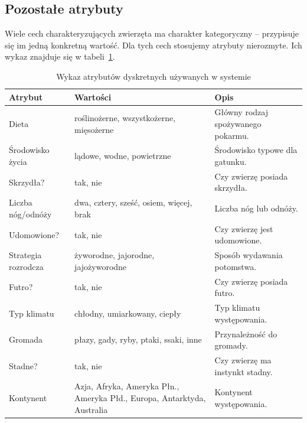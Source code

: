 \documentclass[11pt,a4paper]{article}
\begin{document}
\subsection{Pozostałe atrybuty}
Wiele cech charakteryzujących zwierzęta ma charakter kategoryczny -- przypisuje
się im jedną konkretną wartość. Dla tych cech stosujemy atrybuty nierozmyte.
Ich wykaz znajduje się w tabeli~\ref{tab:discrete}.

\begin{table}[h]
\centering
\caption{Wykaz atrybutów dyskretnych używanych w systemie}
\label{tab:discrete}
\small
\setlength{\tabcolsep}{5pt}
\renewcommand{\arraystretch}{1.2}
\begin{tabularx}{\linewidth}{%
    >{\raggedright\arraybackslash}p{2.9cm}%
    >{\raggedright\arraybackslash\hsize=1.25\hsize}X%
    >{\raggedright\arraybackslash\hsize=0.75\hsize}X}
\toprule
\textbf{Atrybut} & \textbf{Wartości} & \textbf{Opis} \\
\midrule
Dieta               & roślinożerne, wszystkożerne, mięsożerne  & Główny rodzaj spożywanego pokarmu. \\
Środowisko życia    & lądowe, wodne, powietrzne                & Środowisko typowe dla gatunku. \\
Skrzydła?           & tak, nie                                 & Czy zwierzę posiada skrzydła. \\
Liczba nóg/odnóży   & dwa, cztery, sześć, osiem, więcej, brak  & Liczba nóg lub odnóży. \\
Udomowione?         & tak, nie                                 & Czy zwierzę jest udomowione. \\
Strategia rozrodcza & żyworodne, jajorodne, jajożyworodne      & Sposób wydawania potomstwa. \\
Futro?              & tak, nie                                 & Czy zwierzę posiada futro. \\
Typ klimatu         & chłodny, umiarkowany, ciepły             & Typ klimatu występowania. \\
Gromada             & płazy, gady, ryby, ptaki, ssaki, inne    & Przynależność do gromady. \\
Stadne?             & tak, nie                                 & Czy zwierzę ma instynkt stadny. \\
Kontynent           & Azja, Afryka, Ameryka Płn., Ameryka Płd., Europa, Antarktyda, Australia & Kontynent występowania. \\
\bottomrule
\end{tabularx}
\end{table}
\end{document}
